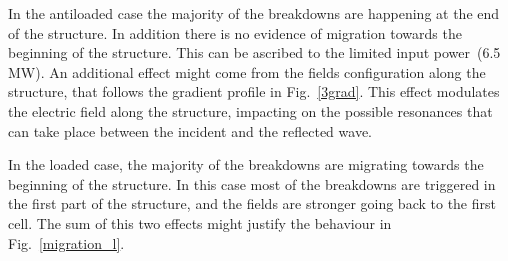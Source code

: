 In the antiloaded case the majority of the breakdowns are happening at the end of the structure. In addition there is no evidence of migration towards the beginning of the structure. This can be ascribed to the limited input power~(6.5 MW). An additional effect might come from the fields configuration along the structure, that follows the gradient profile in Fig.~\ref{3grad}. This effect modulates the electric field along the structure, impacting on the possible resonances that can take place between the incident and the reflected wave.

In the loaded case, the majority of the breakdowns are migrating towards the beginning of the structure. In this case most of the breakdowns are triggered in the first part of the structure, and the fields are stronger going back to the first cell. The sum of this two effects might justify the behaviour in Fig.~\ref{migration_l}.

